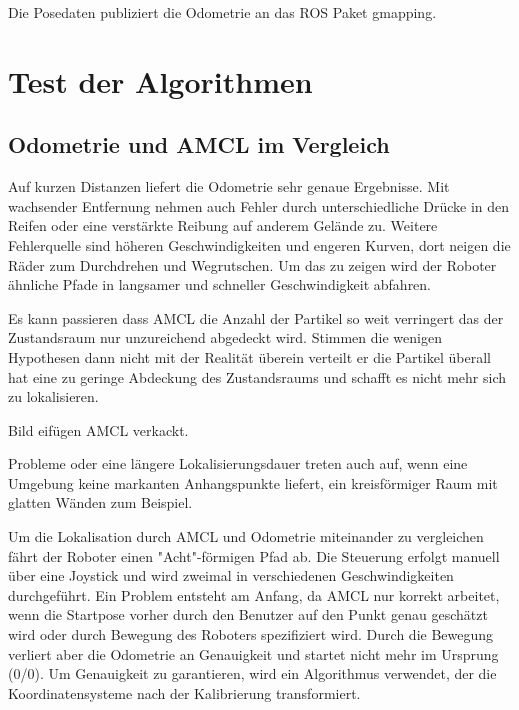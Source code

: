 \documentclass[11pt,a4paper]{article}
\begin{document}
{{	
	
	 Die Posedaten publiziert die Odometrie an das ROS Paket gmapping.	
	
	
} 

\section{Test der Algorithmen} 
\subsection{Odometrie und AMCL im Vergleich}


Auf kurzen Distanzen liefert die Odometrie sehr genaue Ergebnisse. Mit wachsender Entfernung nehmen auch Fehler durch unterschiedliche Dr\"ucke in den Reifen oder eine verst\"arkte Reibung auf anderem Gel\"ande zu. Weitere Fehlerquelle sind h\"oheren Geschwindigkeiten und engeren Kurven, dort neigen die R\"ader zum Durchdrehen und Wegrutschen. Um das zu zeigen wird der Roboter \"ahnliche Pfade in langsamer und schneller Geschwindigkeit abfahren. 	

Es kann passieren dass AMCL die Anzahl der Partikel so weit verringert das der Zustandsraum nur unzureichend abgedeckt wird. Stimmen die wenigen Hypothesen dann nicht mit der Realität überein verteilt er die Partikel überall hat eine zu geringe Abdeckung des Zustandsraums und schafft es nicht mehr sich zu lokalisieren.

Bild eifügen AMCL verkackt.

Probleme oder eine l\"angere Lokalisierungsdauer treten auch auf, wenn eine Umgebung keine markanten Anhangspunkte liefert, ein kreisf\"ormiger Raum mit glatten W\"anden zum Beispiel. 

Um die Lokalisation durch AMCL und Odometrie miteinander zu vergleichen f\"ahrt der Roboter einen "Acht"-f\"ormigen Pfad ab. Die Steuerung erfolgt manuell \"uber eine Joystick und wird zweimal in verschiedenen Geschwindigkeiten durchgef\"uhrt. Ein Problem entsteht am Anfang, da AMCL nur korrekt arbeitet, wenn die Startpose vorher durch den Benutzer auf den Punkt genau gesch\"atzt wird oder durch Bewegung des Roboters spezifiziert wird. Durch die Bewegung verliert aber die Odometrie an Genauigkeit und startet nicht mehr im Ursprung (0/0). Um Genauigkeit zu garantieren, wird ein Algorithmus verwendet, der die Koordinatensysteme nach der Kalibrierung transformiert.

}
\end{document}

